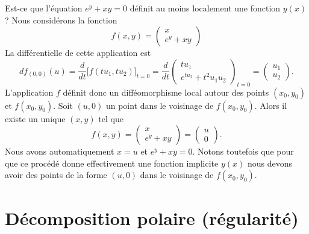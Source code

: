 \begin{example}
	Est-ce que l'équation \( e^{y}+xy=0\) définit au moins localement une fonction \( y(x)\) ? Nous considérons la fonction
	\begin{equation}
		f(x,y)=\begin{pmatrix}
			x \\
			e^{y}+xy
		\end{pmatrix}
	\end{equation}
	La différentielle de cette application est
	\begin{equation}
		df_{(0,0)}(u)=\frac{ d }{ dt }\Big[ f(tu_1,tu_2) \Big]_{t=0}
		=\frac{ d }{ dt }\begin{pmatrix}
			tu_1 \\
			e^{tu_2}+t^2u_1u_2
		\end{pmatrix}_{t=0}
		=\begin{pmatrix}
			u_1 \\
			u_2
		\end{pmatrix}.
	\end{equation}
	L'application \( f\) définit donc un difféomorphisme local autour des points \( (x_0,y_0)\) et \( f(x_0,y_0)\). Soit \( (u,0)\) un point dans le voisinage de \( f(x_0,y_0)\). Alors il existe un unique \( (x,y)\) tel que
	\begin{equation}
		f(x,y)=\begin{pmatrix}
			x \\
			e^y+xy
		\end{pmatrix}=
		\begin{pmatrix}
			u \\
			0
		\end{pmatrix}.
	\end{equation}
	Nous avons automatiquement \( x=u\) et \( e^y+xy=0\). Notons toutefois que pour que ce procédé donne effectivement une fonction implicite \( y(x)\) nous devons avoir des points de la forme \( (u,0)\) dans le voisinage de \( f(x_0,y_0)\).
\end{example}


\section{Décomposition polaire (régularité)}

